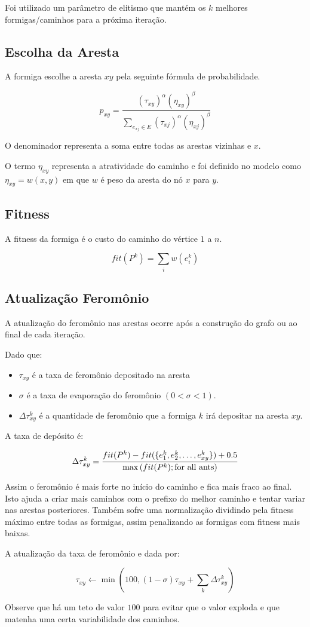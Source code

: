 Foi utilizado um parâmetro de elitismo que mantém os $k$ melhores formigas/caminhos
para a próxima iteração.

\subsection{Escolha da Aresta}

A formiga escolhe a aresta $xy$ pela seguinte fórmula de probabilidade.

$$p_{xy} = \frac{(\tau_{xy})^\alpha(\eta_{xy})^\beta}{\sum\limits_{e_{xj} \in E} (\tau_{xj})^\alpha(\eta_{xj})^\beta }$$

O denominador representa a soma entre todas as arestas vizinhas e $x$.

O termo $\eta_{xy}$ representa a atratividade do caminho e foi definido no modelo como ${\eta _{xy}} = w(x,y)$ em que $w$ é peso da aresta do nó $x$ para $y$.

\subsection{Fitness}

A fitness da formiga é o custo do caminho do vértice $1$ a $n$.

$$fit(P^k) = \sum\limits_{i} w(e_i^k)$$

\subsection{Atualização Feromônio}

A atualização do feromônio nas arestas ocorre após a construção do grafo ou ao final de cada iteração.

Dado que:

\begin{itemize}
    \item $\tau_{xy}$ é a taxa de feromônio depositado na aresta
    \item $\sigma$ é a taxa de evaporação do feromônio $(0 < \sigma < 1)$.
    \item $\Delta \tau _{xy}^k$ é a  quantidade de feromônio que a formiga $k$ irá depositar na aresta $xy$.
\end{itemize}

A taxa de depósito é:

\[\Delta \tau _{xy}^k = \frac{{fit({P^k}) - fit(\{ e_1^k,e_2^k, \ldots ,e_{xy}^k\} ) + 0.5}}{{\max \left( {fit({P^k});{\rm{for\ all\ ants}}} \right)}}\]

Assim o feromônio é mais forte no início do caminho e fica mais fraco ao final. Isto ajuda
a criar mais caminhos com o prefixo do melhor caminho e tentar variar nas arestas posteriores.
Também sofre uma normalização dividindo pela fitness máximo entre todas as formigas, assim penalizando
as formigas com fitness mais baixas.

A atualização da taxa de feromônio e dada por:

\[{\tau _{xy}} \leftarrow \min \left( {100,(1 - \sigma ){\tau _{xy}} + \sum\limits_k \Delta  \tau _{xy}^k} \right)\]

Observe que há um teto de valor $100$ para evitar que o valor exploda e que matenha uma certa variabilidade dos caminhos. 
